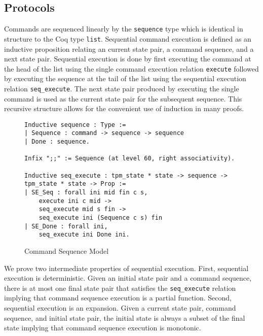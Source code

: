 \documentclass[runningheads]{llncs}
\begin{document}
\subsection{Protocols}

Commands are sequenced linearly by the \verb|sequence| type which is
identical in structure to the Coq type \verb|list|. Sequential command
execution is defined as an inductive proposition relating an current
state pair, a command sequence, and a next state pair. Sequential
execution is done by first executing the command at the head of the
list using the single command execution relation \verb|execute|
followed by executing the sequence at the tail of the list using the
sequential execution relation \verb|seq_execute|. The next state pair
produced by executing the single command is used as the current state
pair for the subsequent sequence. This recursive structure allows for
the convenient use of induction in many proofs.

\begin{figure}[hbtp]
\begin{lstlisting}[language=Coq]
Inductive sequence : Type :=
| Sequence : command -> sequence -> sequence
| Done : sequence.

Infix ";;" := Sequence (at level 60, right associativity).

Inductive seq_execute : tpm_state * state -> sequence -> tpm_state * state -> Prop :=
| SE_Seq : forall ini mid fin c s,
    execute ini c mid ->
    seq_execute mid s fin ->
    seq_execute ini (Sequence c s) fin
| SE_Done : forall ini,
    seq_execute ini Done ini.
\end{lstlisting}
\caption{Command Sequence Model}
\label{fig:command-sequence-model}
\end{figure}

We prove two intermediate properties of sequential execution. First,
sequential execution is deterministic. Given an initial state pair and
a command sequence, there is at most one final state pair that
satisfies the \verb|seq_execute| relation implying that command
sequence execution is a partial function. Second, sequential execution
is an expansion. Given a current state pair, command sequence, and
initial state pair, the initial state is always a subset of the final
state implying that command sequence execution is monotonic.

  
\end{document}
